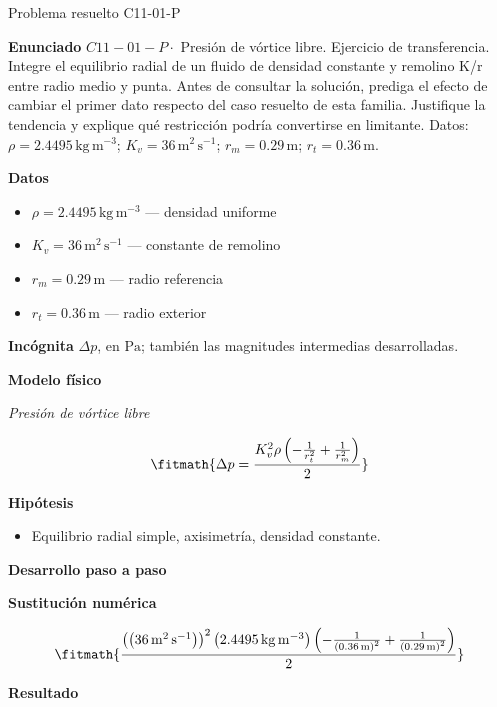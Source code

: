 \documentclass[10pt,openany]{book}
\begin{document}
\begin{studiumworked}{Problema resuelto C11-01-P}


\noindent\textbf{Enunciado}
\(C11-01-P \cdot\) Presión de vórtice libre. Ejercicio de transferencia. Integre el equilibrio radial de un fluido de densidad constante y remolino K/r entre radio medio y punta. Antes de consultar la solución, prediga el efecto de cambiar el primer dato respecto del caso resuelto de esta familia. Justifique la tendencia y explique qué restricción podría convertirse en limitante. Datos: \(\rho=2.4495\, \mathrm{kg}\,\mathrm{m}^{-3}\); \(K_v=36\, \mathrm{m}^{2}\,\mathrm{s}^{-1}\); \(r_m=0.29\, \mathrm{m}\); \(r_t=0.36\, \mathrm{m}\).

\noindent\textbf{Datos}
\begin{itemize}
\item $\rho = 2.4495\,\mathrm{kg}\,\mathrm{m}^{-3}$ — densidad uniforme
\item $K_v = 36\,\mathrm{m}^{2}\,\mathrm{s}^{-1}$ — constante de remolino
\item $r_m = 0.29\,\mathrm{m}$ — radio referencia
\item $r_t = 0.36\,\mathrm{m}$ — radio exterior
\end{itemize}

\noindent\textbf{Incógnita}
$\Delta p$, en $\mathrm{Pa}$; también las magnitudes intermedias desarrolladas.

\noindent\textbf{Modelo físico}

\noindent\textit{Presión de vórtice libre}

\[
\fitmath{\Delta p=\frac{K_v^{2} \rho \left(- \frac{1}{r_t^{2}} + \frac{1}{r_m^{2}}\right)}{2}}
\]

\noindent\textbf{Hipótesis}
\begin{itemize}
\item Equilibrio radial simple, axisimetría, densidad constante.
\end{itemize}

\noindent\textbf{Desarrollo paso a paso}



\noindent\textbf{Sustitución numérica}

\[
\fitmath{\frac{\left(\left(36\,\mathrm{m}^{2}\,\mathrm{s}^{-1}\right)\right)^{2} \left(2.4495\,\mathrm{kg}\,\mathrm{m}^{-3}\right) \left(- \frac{1}{\left(0.36\,\mathrm{m}\right)^{2}} + \frac{1}{\left(0.29\,\mathrm{m}\right)^{2}}\right)}{2}}
\]

\noindent\textbf{Resultado}


\end{studiumworked}
\end{document}
